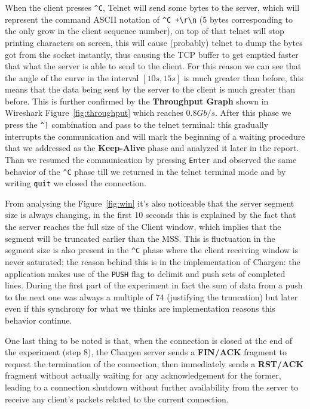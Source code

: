 \documentclass{exam}
\begin{document}
When the client presses \verb|^C|, Telnet will send some bytes to the server, which will represent the command ASCII notation of \verb|^C +\r\n| (5 bytes corresponding to the only grow in the client sequence number), on top of that telnet will stop printing characters on screen, this will cause (probably) telnet to dump the bytes got from the socket instantly, thus causing the TCP buffer to get emptied faster that what the server is able to send to the client. For this reason we can see that the angle of the curve in the interval $[10s, 15s]$ is much greater than before, this means that the data being sent by the server to the client is much greater than before. This is further confirmed by the \textbf{Throughput Graph} shown in Wireshark Figure~\ref{fig:throughput} which reaches $0.8Gb/s$.
After this phase we press the  \verb|^]| combination and pass to the telnet terminal: this gradually interrupts the communication and will mark the beginning of a waiting procedure that we addressed as the \textbf{Keep-Alive} phase and analyzed it later in the report. Than we resumed the communication by pressing \verb|Enter| and observed the same behavior of the \verb|^C| phase till we returned in the telnet terminal mode and by writing \verb|quit| we closed the connection. 


From analysing the Figure~\ref{fig:win} it's also noticeable that the server segment size is always changing, in the first 10 seconds this is explained by the fact that the server reaches the full size of the Client window, which implies that the segment will be truncated earlier than the MSS. This is fluctuation in the segment size is also present in the \verb|^C| phase where the client receiving window is never saturated; the reason behind this is in the implementation of Chargen: the application makes use of the \verb|PUSH| flag to delimit and push sets of completed lines. During the first part of the experiment in fact the sum of data from a push to the next one was always a multiple of 74 (justifying the truncation) but later even if this synchrony for what we thinks are implementation reasons this behavior continue.


One last thing to be noted is that, when the connection is closed at the end of the experiment (step 8), the Chargen server sends a \textbf{FIN/ACK} fragment to request the termination of the connection, then immediately sends a \textbf{RST/ACK} fragment without actually waiting for any acknowledgement for the former, leading to a connection shutdown without further availability from the server to receive any client's packets related to the current connection.
\end{document}
